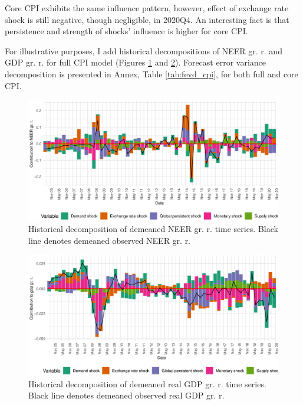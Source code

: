 \documentclass[12pt, a4paper]{extarticle}
\begin{document}
Core CPI exhibits the same influence pattern, however, effect of exchange rate shock is still negative, though negligible, in 2020Q4. An interesting fact is that persistence and strength of shocks' influence is higher for core CPI. 

For illustrative purposes, I add historical decompositions of NEER gr. r. and GDP gr. r. for full CPI model (Figures \ref{fig:hd_neer_full} and \ref{fig:hd_gdp_full}). Forecast error variance decomposition is presented in Annex, Table \ref{tab:fevd_cpi}, for both full and core CPI.

\begin{figure}[h!]
	\centering
	\includegraphics[width=0.95\linewidth]{figures/hd_exrate_full}
	\caption[]{Historical decomposition of demeaned NEER gr. r. time series. Black line denotes demeaned observed NEER gr. r.}
	\label{fig:hd_neer_full}
\end{figure}

\begin{figure}[h!]
	\centering
	\includegraphics[width=0.95\linewidth]{figures/hd_gdp_full}
	\caption[]{Historical decomposition of demeaned real GDP gr. r. time series. Black line denotes demeaned observed real GDP gr. r.}
	\label{fig:hd_gdp_full}
\end{figure}
\end{document}
